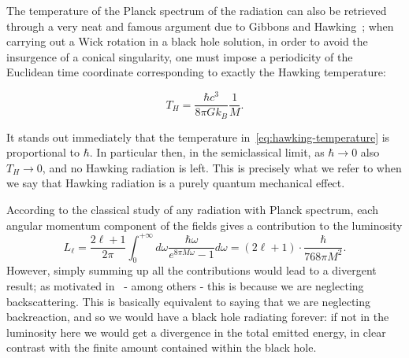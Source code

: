 The temperature of the Planck spectrum of the radiation can also be retrieved through a very neat and famous argument due to Gibbons and Hawking~\cite[]{gibbons1993action}; when carrying out a Wick rotation in a black hole solution, in order to avoid the insurgence of a conical singularity, one must impose a periodicity of the Euclidean time coordinate corresponding to exactly the Hawking temperature:

\begin{equation}
	\label{eq:hawking-temperature}
	T_H = \frac{\hbar c^3}{8\pi Gk_B}\frac{1}{M}.
\end{equation}

\begin{remark}
	It stands out immediately that the temperature in~\eqref{eq:hawking-temperature} is proportional to \(\hbar\). In particular then, in the semiclassical limit, as \(\hbar \rightarrow 0\) also \(T_H \rightarrow 0\), and no Hawking radiation is left. This is precisely what we refer to when we say that Hawking radiation is a purely quantum mechanical effect.
\end{remark}

According to the classical study of any radiation with Planck spectrum, each angular momentum component of the fields gives a contribution to the luminosity
\[
L_{\ell} = \frac{2\ell + 1}{2\pi} \int_0^{+\infty} d\omega \frac{\hbar\omega}{e^{8\pi M\omega} - 1}	d\omega  = (2\ell + 1) \cdot\frac{\hbar}{768\pi M^2}.
\]
However, simply summing up all the contributions would lead to a divergent result; as motivated in~\cite[]{fabbri2005modeling} - among others - this is because we are neglecting backscattering. This is basically equivalent to saying that we are neglecting backreaction, and so we would have a black hole radiating forever: if not in the luminosity here we would get a divergence in the total emitted energy, in clear contrast with the finite amount contained within the black hole.

